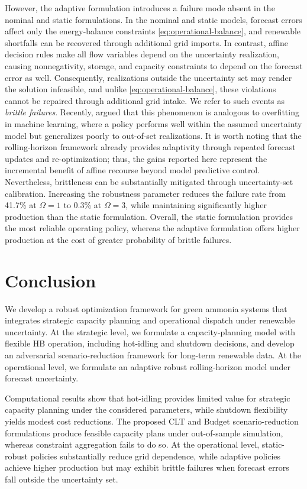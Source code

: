 \documentclass[11pt, letter]{article}
\begin{document}
However, the adaptive formulation introduces a failure mode absent in the nominal and static formulations. In the nominal and static models, forecast errors affect only the energy-balance constraints \eqref{eq:operational-balance}, and renewable shortfalls can be recovered through additional grid imports. In contrast, affine decision rules make all flow variables depend on the uncertainty realization, causing nonnegativity, storage, and capacity constraints to depend on the forecast error as well. Consequently, realizations outside the uncertainty set may render the solution infeasible, and unlike \eqref{eq:operational-balance}, these violations cannot be repaired through additional grid intake. We refer to such events as \emph{brittle failures}. Recently, \citet{zhu_overfitting_2025} argued that this phenomenon is analogous to overfitting in machine learning, where a policy performs well within the assumed uncertainty model but generalizes poorly to out-of-set realizations. It is worth noting that the rolling-horizon framework already provides adaptivity through repeated forecast updates and re-optimization; thus, the gains reported here represent the incremental benefit of affine recourse beyond model predictive control. Nevertheless, brittleness can be substantially mitigated through uncertainty-set calibration. Increasing the robustness parameter reduces the failure rate from 41.7\% at $\Omega=1$ to 0.3\% at $\Omega=3$, while maintaining significantly higher production than the static formulation. Overall, the static formulation provides the most reliable operating policy, whereas the adaptive formulation offers higher production at the cost of greater probability of brittle failures.

\section{Conclusion}\label{section:conclusion}

We develop a robust optimization framework for green ammonia systems that integrates strategic capacity planning and operational dispatch under renewable uncertainty. At the strategic level, we formulate a capacity-planning model with flexible HB operation, including hot-idling and shutdown decisions, and develop an adversarial scenario-reduction framework for long-term renewable data. At the operational level, we formulate an adaptive robust rolling-horizon model under forecast uncertainty.

Computational results show that hot-idling provides limited value for strategic capacity planning under the considered parameters, while shutdown flexibility yields modest cost reductions. The proposed CLT and Budget scenario-reduction formulations produce feasible capacity plans under out-of-sample simulation, whereas constraint aggregation fails to do so. At the operational level, static-robust policies substantially reduce grid dependence, while adaptive policies achieve higher production but may exhibit brittle failures when forecast errors fall outside the uncertainty set.
\end{document}
